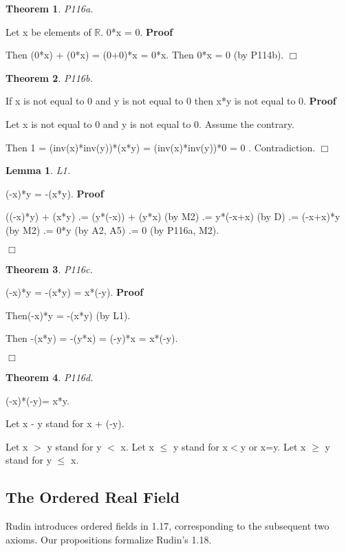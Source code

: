 \documentclass{article}
\newenvironment{forthel}{\begin{leftbar}}{\end{leftbar}}
\newenvironment{proof}{\noindent\textbf{Proof\ }}{\hspace*{\fill}$\Box$\medskip}
\newtheorem{lemma}{Lemma}
\newtheorem{theorem}{Theorem}
\begin{document}
\begin{forthel}
\begin{theorem}
 P116a.
\end{theorem}Let x be elements of $\mathbb{R}$. 0*x = 0.
\begin{proof}

Then (0*x) + (0*x)
= (0+0)*x
= 0*x.
Then 0*x = 0 (by P114b).
\end{proof}

\begin{theorem}
 P116b. 
\end{theorem}If x is not equal to 0 and y is not equal to 0 then x*y is not equal to 0.
\begin{proof}


Let x is not equal to 0 and y is not equal to 0.
Assume the contrary.

Then 1 = (inv(x)*inv(y))*(x*y)
= (inv(x)*inv(y))*0
= 0 .
Contradiction.
\end{proof}


\begin{lemma} L1.

\end{lemma}
(-x)*y = -(x*y).
\begin{proof}


((-x)*y) + (x*y) .= (y*(-x)) + (y*x) (by M2)
.= y*(-x+x) (by D) 
.= (-x+x)*y (by M2)
.= 0*y (by A2, A5)
.= 0 (by P116a, M2).

\end{proof}
 
\begin{theorem}
 P116c.
\end{theorem}(-x)*y = -(x*y) = x*(-y).
\begin{proof}

Then(-x)*y = -(x*y) (by L1).

Then -(x*y) = -(y*x) = (-y)*x = x*(-y).

\end{proof}
 

\begin{theorem}
 P116d.
\end{theorem}(-x)*(-y)= x*y.


Let x - y stand for x + (-y).


Let x $>$ y stand for y $<$ x.
Let x $\leq$ y stand for x$<$y or x=y.
Let x $\geq$ y stand for y $\leq$ x.



\end{forthel}

\subsection{The Ordered Real Field}
Rudin introduces ordered fields in 1.17, corresponding to the subsequent two axioms. Our propositions formalize Rudin's 1.18.
\end{document}
